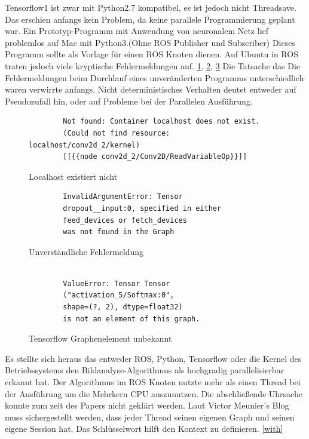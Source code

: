 \documentclass[conference]{IEEEtran}
\begin{document}
Tensorflow1 ist zwar mit Python2.7 kompatibel, es ist jedoch nicht 
Threadsave. Das erschien anfangs kein Problem, da keine parallele 
	Programmierung geplant war. Ein Prototyp-Programm mit Anwendung von 
	neuronalem Netz lief problemlos auf Mac mit Python3.(Ohne ROS 
	Publisher und Subscriber) Dieses Programm 
	sollte als Vorlage für einen ROS Knoten dienen. Auf Ubuntu in ROS traten 
	jedoch viele kryptische Fehlermeldungen auf. \ref{Error1}, \ref{Error2}, 
	\ref{Error3} Die Tatsache das Die Fehlermeldungen beim Durchlauf eines 
	unveränderten Programms unterschiedlich waren verwirrte anfangs. 
	Nicht deterministisches Verhalten deutet entweder auf Pseudozufall hin, 
	oder auf Probleme bei der Parallelen Ausführung. 
	
	\begin{figure}
		\centering
		\begin{verbatim}
		Not found: Container localhost does not exist. 
		(Could not find resource: localhost/conv2d_2/kernel)
		[[{{node conv2d_2/Conv2D/ReadVariableOp}}]]
		\end{verbatim}
		\label{Error1}
		\caption{Localhost existiert nicht}
	\end{figure}
	
	\begin{figure}
		\centering
		\begin{verbatim}
		InvalidArgumentError: Tensor 
		dropout__input:0, specified in either 
		feed_devices or fetch_devices
		was not found in the Graph
		\end{verbatim}
		\label{Error2}
		\caption{Unverständliche Fehlermeldung}
	\end{figure}
		
	\begin{figure}
		\centering
		\begin{verbatim}
		
		ValueError: Tensor Tensor
		("activation_5/Softmax:0",
		shape=(?, 2), dtype=float32) 
		is not an element of this graph.
		\end{verbatim}
		\label{Error3}
		\caption{Tensorflow Graphenelement unbekannt}
	\end{figure}
	
	Es stellte sich heraus das entweder ROS, Python, Tensorflow oder die Kernel 
	des Betriebssystems den Bildanalyse-Algorithmus als hochgradig 
	parallelisierbar erkannt hat. Der Algorithmus im  ROS Knoten nutzte mehr 
	als einen Thread bei der Ausführung um die Mehrkern CPU auszunutzen. 
	Die abschließende Uhrsache konnte zum zeit des Papers nicht geklärt 
	werden.
	Laut Victor Meunier's Blog  \cite{Keras} 
	muss sichergestellt werden, dass jeder Thread seinen eigenen Graph und seinen eigene Session hat. Das Schlüsselwort  hilft den Kontext zu definieren. \ref{with} \\
	
\end{document}
